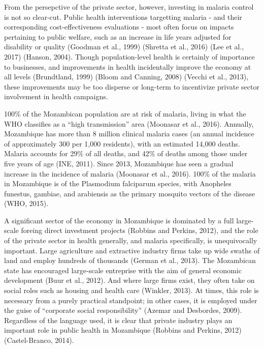 \documentclass[]{article}
\begin{document}
From the persepctive of the private sector, however, investing in
malaria control is not so clear-cut. Public health interventions
targetting malaria - and their corresponding cost-effectiveness
evaluations - most often focus on impacts pertaining to public welfare,
such as an increase in life years adjusted for disability or quality
(Goodman et al., 1999) (Shretta et al., 2016) (Lee et al., 2017)
(Hanson, 2004). Though population-level health is certainly of
importance to businesses, and improvements in health incidentally
improve the economy at all levels (Brundtland, 1999) (Bloom and Canning,
2008) (Vecchi et al., 2013), these improvements may be too disperse or
long-term to incentivize private sector involvement in health campaigns.

100\% of the Mozambican population are at risk of malaria, living in
what the WHO classifies as a ``high transmission'' area (Moonasar et
al., 2016). Annually, Mozambique has more than 8 million clinical
malaria cases (an annual incidence of approximately 300 per 1,000
residents), with an estimated 14,000 deaths. Malaria accounts for 29\%
of all deaths, and 42\% of deaths among those under five years of age
(INE, 2011). Since 2013, Mozambique has seen a gradual increase in the
incidence of malaria (Moonasar et al., 2016). 100\% of the malaria in
Mozambique is of the Plasmodium falciparum species, with Anopheles
funestus, gambiae, and arabiensis as the primary mosquito vectors of the
disease (WHO, 2015).

A significant sector of the economy in Mozambique is dominated by a full
large-scale foreing direct investment projects (Robbins and Perkins,
2012), and the role of the private sector in health generally, and
malaria specifically, is unequivocally important. Large agriculture and
extractive industry firms take up wide swaths of land and employ
hundreds of thousands (German et al., 2013). The Mozambican state has
encouraged large-scale entreprise with the aim of general economic
development (Buur et al., 2012). And where large firms exist, they often
take on social roles such as housing and health care (Winkler, 2013). At
times, this role is necessary from a purely practical standpoint; in
other cases, it is employed under the guise of ``corporate social
responsibility'' (Azemar and Desbordes, 2009). Regardless of the
language used, it is clear that private industry plays an important role
in public health in Mozambique (Robbins and Perkins, 2012)
(Castel-Branco, 2014).
\end{document}
